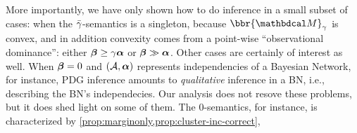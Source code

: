 More importantly, we have only shown how to do inference in a small subset of cases:
when the ${\bar\gamma}$-semantics is a 
singleton, because $\bbr{\dg M}_{\gamma}$ is convex, 
and in addition convexity comes from a point-wise ``observational dominance'': either $\boldsymbol\beta \ge \gamma \boldsymbol\alpha$ or $\boldsymbol\beta \gg \boldsymbol\alpha$. 
Other cases are certainly of interest as well.
When $\boldsymbol\beta = 0$ and $(\mathcal A, \boldsymbol\alpha)$ represents independencies of a Bayesian Network, for instance, PDG inference amounts to \emph{qualitative} inference in a BN, i.e., describing the BN's independecies. 
Our analysis does not resove these problems, but it
    does shed light on some of them.  
The $0$-semantics, for instance, is 
characterized by \cref{prop:marginonly,prop:cluster-inc-correct}, 
